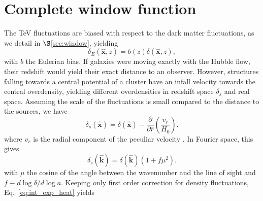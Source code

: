 \documentclass[numberedappendix]{emulateapj}
\begin{document}
\section{Complete window function}
\label{sec:window_complete}
The TeV fluctuations are biased with respect to the dark matter fluctuations, as we detail in $\S$\ref{sec:window}, yielding
\begin{equation}
\delta_E(\mathbf{\hat{x}},z)=b(z)\delta(\mathbf{\hat{x}},z),
\label{eq:bias}
\end{equation}
with $b$ the Eulerian bias. If galaxies were moving exactly with the Hubble flow, their redshift would yield their exact distance to an observer. However, structures falling towards a central potential of a cluster have an infall velocity  towards the central overdensity, yielding different overdensities in redshift space $\delta_s$ and real space.
Assuming the scale of the fluctuations is small compared to the distance to the sources,   we have  
\begin{equation}
  \label{eq:real_vs_z}
  \delta_s(\mathbf{\hat{x}})=\delta(\mathbf{\hat{x}})-\frac{\partial }{\partial \hat{r}}\left(\frac{v_r}{H_0}\right).
\end{equation}
where $v_r$ is the radial component of the peculiar velocity \citep{MFW}. In Fourier space, this gives
\begin{equation}
  \label{eq:real_vs_z}
  \delta_s(\mathbf{\hat{k}})=\delta(\mathbf{\hat{k}})(1+f\mu^2).
\end{equation}
with $\mu$ the cosine of the angle between the wavenumber and the line of sight and $f\equiv d\log\delta/d\log a$. Keeping only first order correction for density fluctuations, Eq.~\eqref{eq:int_exp_heat} yields
\end{document}
